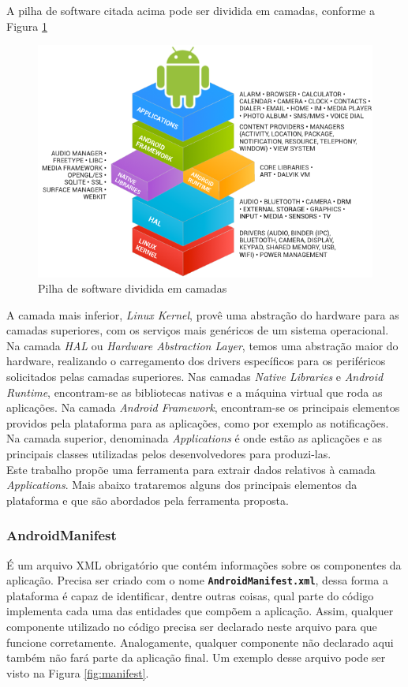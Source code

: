\documentclass[a4paper,12pt]{article}
\begin{document}
A pilha de software citada acima pode ser dividida em camadas, conforme a Figura \ref{fig:androidStack}

\begin{figure}[h]
\centering
\includegraphics[width=0.8\linewidth]{imgs/android_framework_details.png}
\caption{Pilha de software dividida em camadas \cite{androidSource}}
\label{fig:androidStack}
\end{figure}


A camada mais inferior, \textit{Linux Kernel}, provê uma abstração do hardware para as camadas superiores, com os serviços mais genéricos de um sistema operacional. Na camada \textit{HAL} ou \textit{Hardware Abstraction Layer}, temos uma abstração maior do hardware, realizando o carregamento dos drivers específicos para os periféricos solicitados pelas camadas superiores. Nas camadas \textit{Native Libraries} e \textit{Android Runtime}, encontram-se as bibliotecas nativas e a máquina virtual que roda as aplicações. Na camada \textit{Android Framework}, encontram-se os principais elementos providos pela plataforma para as aplicações, como por exemplo as notificações. Na camada superior, denominada \textit{Applications} é onde estão as aplicações e as principais classes utilizadas pelos desenvolvedores para produzi-las. \\

Este trabalho propõe uma ferramenta para extrair dados relativos à camada \textit{Applications}. Mais abaixo trataremos alguns dos principais elementos da plataforma e que são abordados pela ferramenta proposta.


\subsubsection{AndroidManifest}
É um arquivo XML obrigatório que contém informações sobre os componentes da aplicação. Precisa ser criado com o nome {\small\texttt{\textbf{AndroidManifest.xml}}}, dessa forma a plataforma é capaz de identificar, dentre outras coisas, qual parte do código implementa cada uma das entidades que compõem a aplicação. Assim, qualquer componente utilizado no código precisa ser declarado neste arquivo para que funcione corretamente. Analogamente, qualquer componente não declarado aqui também não fará parte da aplicação final. Um exemplo desse arquivo pode ser visto na Figura \ref{fig:manifest}.\\
\end{document}
